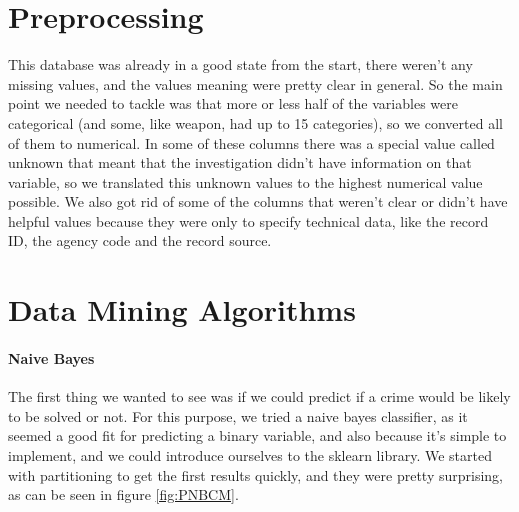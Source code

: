 \documentclass[12pt]{report}
\begin{document}
%

\section{Preprocessing}

This database was already in a good state from the start, there weren't any missing values, and the values meaning were pretty clear in general. So the main point we needed to tackle was that more or less half of the variables were categorical (and some, like weapon, had up to 15 categories), so we converted all of them to numerical. In some of these columns there was a special value called unknown that meant that the investigation didn't have information on that variable, so we translated this unknown values to the highest numerical value possible.
We also got rid of some of the columns that weren't clear or didn't have helpful values because they were only to specify technical data, like the record ID, the agency code and the record source.

\section{Data Mining Algorithms}

\paragraph{Naive Bayes}

The first thing we wanted to see was if we could predict if a crime would be likely to be solved or not. For this purpose, we tried a naive bayes classifier, as it seemed a good fit for predicting a binary variable, and also because it's simple to implement, and we could introduce ourselves to the sklearn library.
We started with partitioning to get the first results quickly, and they were pretty surprising, as can be seen in figure 	 \ref{fig:PNBCM}.
\end{document}

